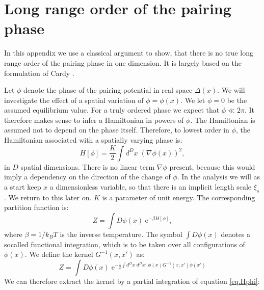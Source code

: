 
\chapter{Long range order of the pairing phase} %

\label{Appendix.longrangeorder.pairingphase} %
\chead{}
In this appendix we use a classical argument to show, that there is no true long range order of the pairing phase in one dimension. It is largely based on the formulation of Cardy \cite{Cardy.StatPhys}. 

Let $\phi$ denote the phase of the pairing potential in real space $\Delta(x)$. We will investigate the effect of a spatial variation of $\phi = \phi(x)$. We let $\phi = 0$ be the assumed equilibrium value. For a truly ordered phase we expect that $\phi \ll 2\pi$. It therefore makes sense to infer a Hamiltonian in powers of $\phi$. The Hamiltonian is assumed not to depend on the phase itself. Therefore, to lowest order in $\phi$, the Hamiltonian associated with a spatially varying phase is: 
\begin{equation}
H[\phi] = \frac{K}{2}\int d^{D}x \; \left(\nabla \phi(x)\right)^2, 
\label{eq.Hphi}
\end{equation}
in $D$ spatial dimensions. There is no linear term $\nabla \phi$ present, because this would imply a dependency on the direction of the change of $\phi$. 
In the analysis we will as a start keep $x$ a dimensionless variable, so that there is an implicit length scale $\xi_s$. We return to this later on. $K$ is a parameter of unit energy. The corresponding partition function is: 
\begin{equation}
Z = \int D\phi(x) \; \text{e}^{-\beta H[\phi]}, 
\label{eq.partitionfunction}
\end{equation}
where $\beta = 1 / k_BT$ is the inverse temperature. The symbol $\int D\phi(x)$ denotes a socalled functional integration, which is to be taken over all configurations of $\phi(x)$. We define the kernel $G^{-1}(x,x')$ as: 
\begin{equation}
Z = \int D\phi(x)\; \text{e}^{-\frac{1}{2}\int d^{D}x\; d^{D}x' \; \phi(x)G^{-1}(x,x')\phi(x')} \nonumber
\end{equation}
We can therefore extract the kernel by a partial integration of equation \eqref{eq.Hphi}: 
